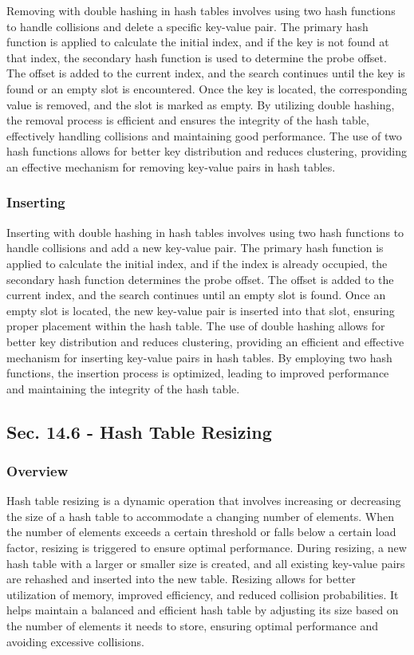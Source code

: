 Removing with double hashing in hash tables involves using two hash functions to handle collisions and delete a specific key-value pair. The primary hash function is applied to calculate the initial index, 
and if the key is not found at that index, the secondary hash function is used to determine the probe offset. The offset is added to the current index, and the search continues until the key is found or an 
empty slot is encountered. Once the key is located, the corresponding value is removed, and the slot is marked as empty. By utilizing double hashing, the removal process is efficient and ensures the integrity 
of the hash table, effectively handling collisions and maintaining good performance. The use of two hash functions allows for better key distribution and reduces clustering, providing an effective mechanism 
for removing key-value pairs in hash tables.

\subsubsection{Inserting}

Inserting with double hashing in hash tables involves using two hash functions to handle collisions and add a new key-value pair. The primary hash function is applied to calculate the initial index, and if the 
index is already occupied, the secondary hash function determines the probe offset. The offset is added to the current index, and the search continues until an empty slot is found. Once an empty slot is located, 
the new key-value pair is inserted into that slot, ensuring proper placement within the hash table. The use of double hashing allows for better key distribution and reduces clustering, providing an efficient and 
effective mechanism for inserting key-value pairs in hash tables. By employing two hash functions, the insertion process is optimized, leading to improved performance and maintaining the integrity of the hash table.

\subsection*{Sec. 14.6 - Hash Table Resizing}

\subsubsection{Overview}

Hash table resizing is a dynamic operation that involves increasing or decreasing the size of a hash table to accommodate a changing number of elements. When the number of elements exceeds a certain threshold or 
falls below a certain load factor, resizing is triggered to ensure optimal performance. During resizing, a new hash table with a larger or smaller size is created, and all existing key-value pairs are rehashed and 
inserted into the new table. Resizing allows for better utilization of memory, improved efficiency, and reduced collision probabilities. It helps maintain a balanced and efficient hash table by adjusting its size 
based on the number of elements it needs to store, ensuring optimal performance and avoiding excessive collisions.


